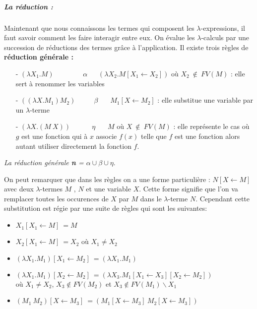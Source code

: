 \documentclass[10pt,a4paper]{article}
\begin{document}
				
				\subparagraph{La réduction :}Maintenant que nous connaissons les termes qui composent les $\lambda$-expressions, il faut savoir comment les faire interagir entre eux. On évalue les $\lambda$-calculs par une succession de réductions des termes grâce à l'application. Il existe trois règles de \textbf{réduction générale :}
				\begin{itemize}
					\item[-] $(\lambda X_{1}.M)~~~~~~~~~~~~~~~~~~~\alpha~~~~~~~(\lambda X_{2}.M[X_{1} \leftarrow X_{2}])$
					où $X_{2}~\notin~FV(M)$ : elle sert à renommer les variables
					\item[-] $((\lambda X.M_{1})M_{2})~~~~~~~~~~~~\beta~~~~~~~~M_{1}[X \leftarrow M_{2}]$ : elle substitue une variable par un $\lambda$-terme
    				\item[-] $(\lambda X.(M~X))~~~~~~~~~~~~~~\eta~~~~~~~~M$ 
					où $X~\notin~FV(M)$ : elle représente le cas où $g$ est une fonction qui à $x$ associe $f(x)$  telle que $f$ est une fonction alors autant utiliser directement la fonction $f$.
				\end{itemize}
				\medbreak
				
				\textit{La réduction générale \textbf{n} = $\alpha \cup \beta \cup \eta$}.
				\bigbreak
				
				
				On peut remarquer que dans les règles on a une forme particulière : $N [X \leftarrow M]$ avec deux $\lambda$-termes $M$ , $N$ et une variable $X$. Cette forme signifie que l'on va remplacer toutes les occurences de $X$ par $M$ dans le $\lambda$-terme $N$. Cependant cette substitution est régie par une suite de règles qui sont les suivantes: 
				\begin{itemize}
					\item $X_{1}[X_{1} \leftarrow M]~= M$
					\item $X_{2}[X_{1} \leftarrow M]~= X_{2}$ où $X_{1}\neq X_{2}$
					\item $(\lambda X_{1}.M_{1})[X_{1} \leftarrow M_{2}]~= (\lambda X_{1}.M_{1})$
					\item $(\lambda X_{1}.M_{1})[X_{2} \leftarrow M_{2}]~= (\lambda X_{3}.M_{1}[X_{1} \leftarrow X_{3}][X_{2} \leftarrow M_{2}])$ 
					\\où $X_{1} \neq X_{2}$, $X_{3} \notin FV(M_{2})$ et $X_{3} \notin FV(M_{1})\backslash{X_{1}}$ 
					\item $(M_{1}~M_{2})[X \leftarrow M_{3}]~=(M_{1}[X \leftarrow M_{3}]~M_{2}[X \leftarrow M_{3}])$
				\end{itemize}
				\bigbreak
				
\end{document}
